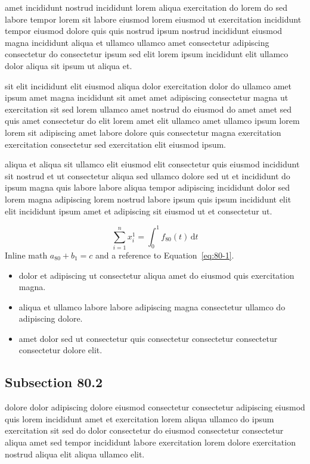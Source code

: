 \documentclass{article}
\begin{document}
amet incididunt nostrud incididunt lorem aliqua exercitation do lorem do sed labore tempor lorem sit labore eiusmod lorem eiusmod ut exercitation incididunt tempor eiusmod dolore quis quis nostrud ipsum nostrud incididunt eiusmod magna incididunt aliqua et ullamco ullamco amet consectetur adipiscing consectetur do consectetur ipsum sed elit lorem ipsum incididunt elit ullamco dolor aliqua sit ipsum ut aliqua et.

sit elit incididunt elit eiusmod aliqua dolor exercitation dolor do ullamco amet ipsum amet magna incididunt sit amet amet adipiscing consectetur magna ut exercitation sit sed lorem ullamco amet nostrud do eiusmod do amet amet sed quis amet consectetur do elit lorem amet elit ullamco amet ullamco ipsum lorem lorem sit adipiscing amet labore dolore quis consectetur magna exercitation exercitation consectetur sed exercitation elit eiusmod ipsum.

aliqua et aliqua sit ullamco elit eiusmod elit consectetur quis eiusmod incididunt sit nostrud et ut consectetur aliqua sed ullamco dolore sed ut et incididunt do ipsum magna quis labore labore aliqua tempor adipiscing incididunt dolor sed lorem magna adipiscing lorem nostrud labore ipsum quis ipsum incididunt elit elit incididunt ipsum amet et adipiscing sit eiusmod ut et consectetur ut.

\begin{equation}\label{eq:80-1}
  \sum_{i=1}^{n} x_i^{1} = \int_0^1 f_{80}(t)\,\mathrm{d}t
\end{equation}
Inline math $a_{80} + b_{1} = c$ and a reference to Equation~\eqref{eq:80-1}.

\begin{itemize}
  \item dolor et adipiscing ut consectetur aliqua amet do eiusmod quis exercitation magna.
  \item aliqua et ullamco labore labore adipiscing magna consectetur ullamco do adipiscing dolore.
  \item amet dolor sed ut consectetur quis consectetur consectetur consectetur consectetur dolore elit.
\end{itemize}

\subsection{Subsection 80.2}\label{sec:80-2}
dolore dolor adipiscing dolore eiusmod consectetur consectetur adipiscing eiusmod quis lorem incididunt amet et exercitation lorem aliqua ullamco do ipsum exercitation sit sed do dolor consectetur do eiusmod consectetur consectetur aliqua amet sed tempor incididunt labore exercitation lorem dolore exercitation nostrud aliqua elit aliqua ullamco elit.
\end{document}
